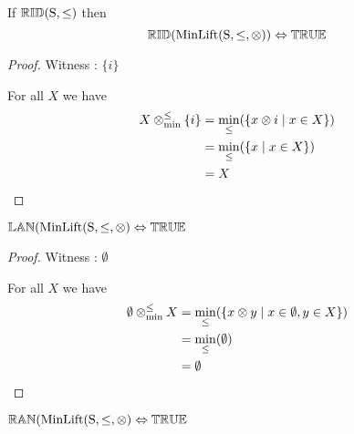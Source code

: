 \begin{theorem} \label{thm:minlift_rid}
If ${\mathbb{RID}}\mathrm{(S,\leq)}$ then
\begin{equation*}
{\mathbb{RID}}(\mathrm{MinLift(S,\leq,\otimes)}) \Leftrightarrow {\mathbb{TRUE}}
\end{equation*}
\end{theorem}

\begin{proof}

\vspace{0.5em}

Witness : $\{ i \}$

\vspace{0.5em}

For all $X$ we have
\begin{align*}
X \mathbin{\otimes_{\min}^{\leq}} \{ i \} 	& = \min_\leq(\{x \otimes i \mid x \in X\}) \\
					& = \min_\leq(\{x \mid x \in X\}) \\
					& = X
\end{align*}
\end{proof}





\begin{theorem}  \label{thm:minlift_lan}
${\mathbb{LAN}}(\mathrm{MinLift(S,\leq,\otimes)} \Leftrightarrow {\mathbb{TRUE}}$
\end{theorem}

\begin{proof}

\vspace{0.5em}

Witness : $\emptyset$

\vspace{0.5em}

For all $X$ we have
\begin{align*}
\emptyset \mathbin{\otimes_{\min}^{\leq}} X 	& = \min_\leq(\{ x \otimes y \mid x \in \emptyset, y \in X\}) \\
						& = \min_\leq(\emptyset) \\
						& = \emptyset
\end{align*}
\end{proof}






\begin{theorem}  \label{thm:minlift_ran}
${\mathbb{RAN}}(\mathrm{MinLift(S,\leq,\otimes)} \Leftrightarrow {\mathbb{TRUE}}$
\end{theorem}

